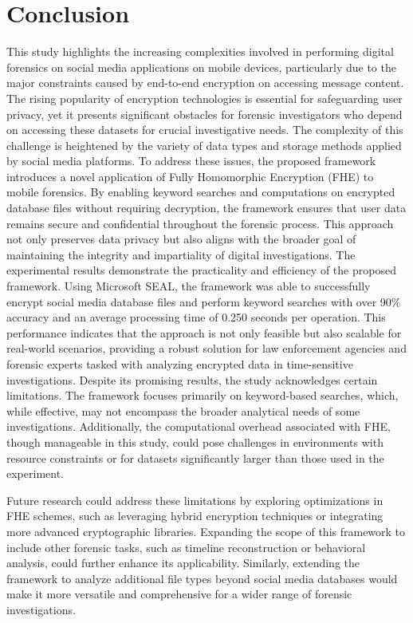 \documentclass[conference]{IEEEtran}
\begin{document}
\section{Conclusion}
This study highlights the increasing complexities involved in performing digital forensics on social media applications on mobile devices, particularly due to the major constraints caused by end-to-end encryption on accessing message content. The rising popularity of encryption technologies is essential for safeguarding user privacy, yet it presents significant obstacles for forensic investigators who depend on accessing these datasets for crucial investigative needs. The complexity of this challenge is heightened by the variety of data types and storage methods applied by social media platforms.
To address these issues, the proposed framework introduces a novel application of Fully Homomorphic Encryption (FHE) to mobile forensics. By enabling keyword searches and computations on encrypted database files without requiring decryption, the framework ensures that user data remains secure and confidential throughout the forensic process. This approach not only preserves data privacy but also aligns with the broader goal of maintaining the integrity and impartiality of digital investigations.
The experimental results demonstrate the practicality and efficiency of the proposed framework. Using Microsoft SEAL, the framework was able to successfully encrypt social media database files and perform keyword searches with over 90\% accuracy and an average processing time of 0.250 seconds per operation. This performance indicates that the approach is not only feasible but also scalable for real-world scenarios, providing a robust solution for law enforcement agencies and forensic experts tasked with analyzing encrypted data in time-sensitive investigations.
Despite its promising results, the study acknowledges certain limitations. The framework focuses primarily on keyword-based searches, which, while effective, may not encompass the broader analytical needs of some investigations. Additionally, the computational overhead associated with FHE, though manageable in this study, could pose challenges in environments with resource constraints or for datasets significantly larger than those used in the experiment.

Future research could address these limitations by exploring optimizations in FHE schemes, such as leveraging hybrid encryption techniques or integrating more advanced cryptographic libraries. Expanding the scope of this framework to include other forensic tasks, such as timeline reconstruction or behavioral analysis, could further enhance its applicability. Similarly, extending the framework to analyze additional file types beyond social media databases would make it more versatile and comprehensive for a wider range of forensic investigations.
\end{document}
